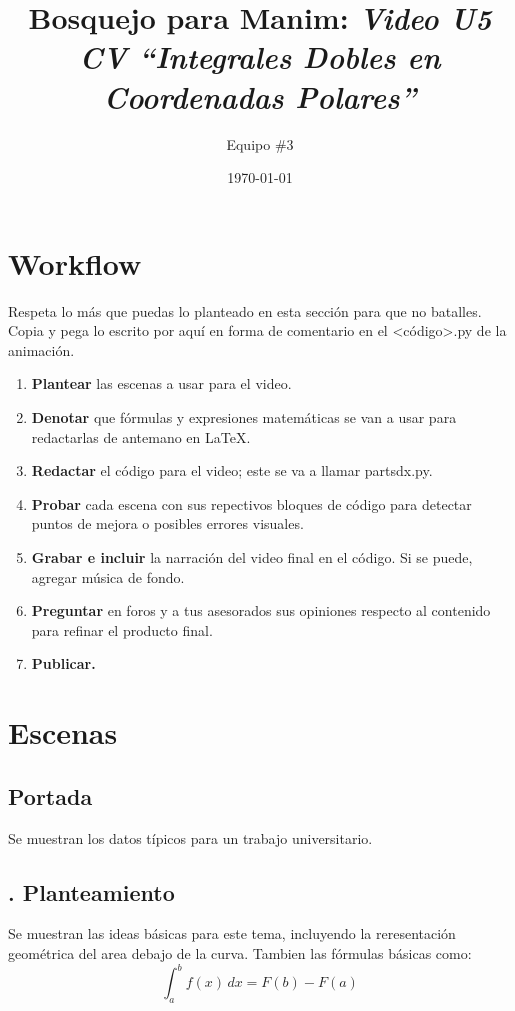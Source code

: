 \documentclass[letterpaper, 12pt]{article}
\title{Bosquejo para \textbf{Manim:} 
    {\fontfamily{qag}\selectfont
        \emph{Video U5 CV ``Integrales Dobles en Coordenadas Polares''}
    }
}
\author{Equipo \#3}
\date{\today}
\begin{document}
\maketitle
\thispagestyle{empty}
\section*{Workflow}
\justify
Respeta lo más que puedas lo planteado en esta sección para que no batalles. Copia y pega lo escrito por aquí en forma de comentario en el {\selectfont<código>.py} de la animación.
    \begin{enumerate}
        \item \textbf{Plantear} las escenas a usar para el video.
        \item \textbf{Denotar} que fórmulas y expresiones matemáticas se van a usar para redactarlas de antemano en \LaTeX.
        \item \textbf{Redactar} el código para el video; este se va a llamar {\selectfont partsdx.py}.
        \item \textbf{Probar} cada escena con sus repectivos bloques de código para detectar puntos de mejora o posibles errores visuales.
        \item \textbf{Grabar e incluir} la narración del video final en el código. Si se puede, agregar música de fondo.
        \item \textbf{Preguntar} en foros y a tus asesorados sus opiniones respecto al contenido para refinar el producto final.
        \item \textbf{Publicar.}
    \end{enumerate}

\section*{Escenas}
\subsection*{{\selectfont Portada}} \justify
Se muestran los datos típicos para un trabajo universitario.
\subsection*{{. Planteamiento}} \justify
Se muestran las ideas básicas para este tema, incluyendo la reresentación geométrica del area debajo de la curva. Tambien las fórmulas básicas como:
\[\int_a^b f(x)\, dx=F(b)-F(a)\]
\end{document}
